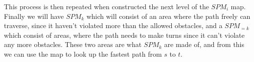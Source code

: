 This process is then repeated when constructed the next level of the $SPM_i$ map. Finally we 
will have $SPM_k$ which will consist of an area where the path freely can traverse, since it 
haven't violated more than the allowed obstacles, and a $SPM_{=k}$ which consist of areas, 
where the path needs to make turns since it can't violate any more obstacles. These two areas 
are what $SPM_k$ are made of, and from this we can use the map to look up the fastest path 
from $s$ to $t$.
